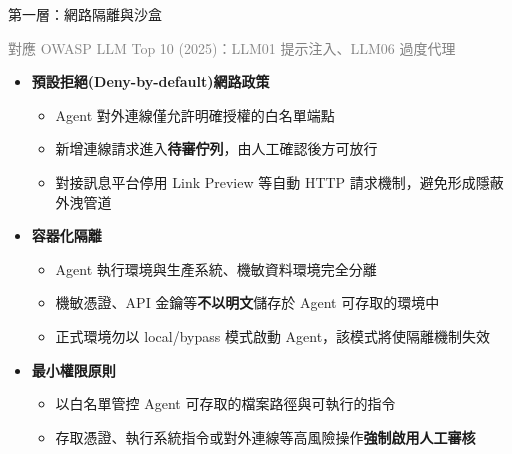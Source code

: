 \documentclass[aspectratio=1610]{Common/MyCourseBeamer}
\begin{document}
\begin{frame}[allowframebreaks=0.85]{第一層：網路隔離與沙盒}

	{\scriptsize\textcolor{gray}{對應 OWASP LLM Top 10 (2025)：LLM01 提示注入、LLM06 過度代理}}\vspace{0.3em}

	\begin{itemize}
		\item \textbf{預設拒絕(Deny-by-default)網路政策}
			\begin{itemize}
				\item Agent 對外連線僅允許明確授權的白名單端點
				\item 新增連線請求進入\textbf{待審佇列}，由人工確認後方可放行
				\item 對接訊息平台停用 Link Preview 等自動 HTTP 請求機制，避免形成隱蔽外洩管道
			\end{itemize}

		\item \textbf{容器化隔離}
			\begin{itemize}
				\item Agent 執行環境與生產系統、機敏資料環境\alert{完全分離}
				\item 機敏憑證、API 金鑰等\textbf{不以明文}儲存於 Agent 可存取的環境中
				\item 正式環境勿以 local/bypass 模式啟動 Agent，該模式將使隔離機制失效
			\end{itemize}

        \framebreak
		\item \textbf{最小權限原則}
			\begin{itemize}
				\item 以白名單管控 Agent 可存取的檔案路徑與可執行的指令
				\item 存取憑證、執行系統指令或對外連線等高風險操作\textbf{強制啟用人工審核}
			\end{itemize}
	\end{itemize}

\end{frame}
\end{document}
